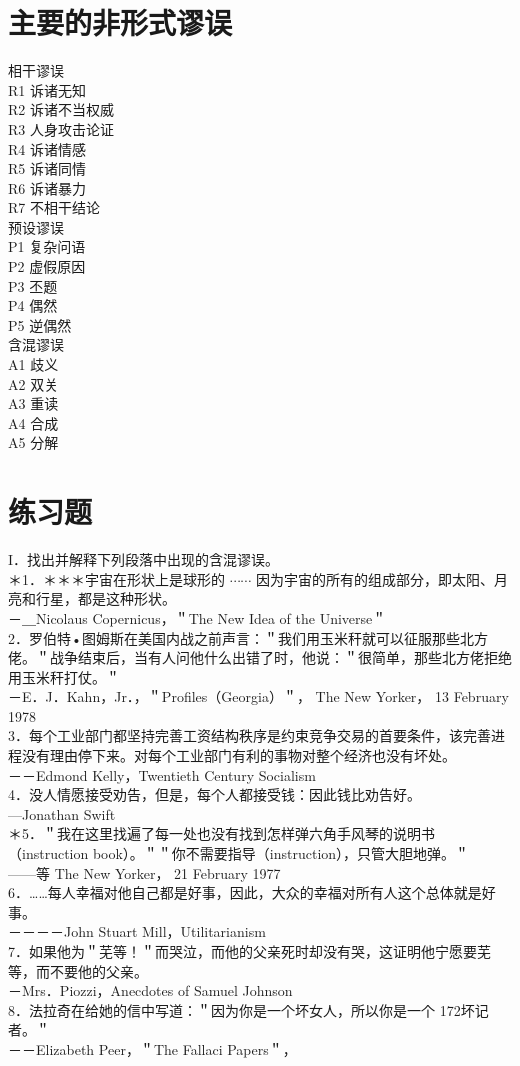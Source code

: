 \section*{主要的非形式谬误}
相干谬误\\
R1 诉诸无知\\
R2 诉诸不当权威\\
R3 人身攻击论证\\
R4 诉诸情感\\
R5 诉诸同情\\
R6 诉诸暴力\\
R7 不相干结论\\
预设谬误\\
P1 复杂问语\\
P2 虚假原因\\
P3 丕题\\
P4 偶然\\
P5 逆偶然\\
含混谬误\\
A1 歧义\\
A2 双关\\
A3 重读\\
A4 合成\\
A5 分解

\section*{练习题}
I．找出并解释下列段落中出现的含混谬误。\\
＊1．＊＊＊宇宙在形状上是球形的 $\cdots \cdots$ 因为宇宙的所有的组成部分，即太阳、月亮和行星，都是这种形状。\\
－＿Nicolaus Copernicus，＂The New Idea of the Universe＂\\
2．罗伯特•图姆斯在美国内战之前声言：＂我们用玉米秆就可以征服那些北方佬。＂战争结束后，当有人问他什么出错了时，他说：＂很简单，那些北方佬拒绝用玉米秆打仗。＂\\
－E．J．Kahn，Jr．，＂Profiles（Georgia）＂， The New Yorker， 13 February 1978\\
3．每个工业部门都坚持完善工资结构秩序是约束竞争交易的首要条件，该完善进程没有理由停下来。对每个工业部门有利的事物对整个经济也没有坏处。\\
－－Edmond Kelly，Twentieth Century Socialism\\
4．没人情愿接受劝告，但是，每个人都接受钱：因此钱比劝告好。\\
—Jonathan Swift\\
＊5．＂我在这里找遍了每一处也没有找到怎样弹六角手风琴的说明书 （instruction book）。＂＂你不需要指导（instruction），只管大胆地弹。＂\\
——等 The New Yorker， 21 February 1977\\
6．……每人幸福对他自己都是好事，因此，大众的幸福对所有人这个总体就是好事。\\
－－－－John Stuart Mill，Utilitarianism\\
7．如果他为＂芜等！＂而哭泣，而他的父亲死时却没有哭，这证明他宁愿要芜等，而不要他的父亲。\\
－Mrs．Piozzi，Anecdotes of Samuel Johnson\\
8．法拉奇在给她的信中写道：＂因为你是一个坏女人，所以你是一个 172坏记者。＂\\
－－Elizabeth Peer，＂The Fallaci Papers＂，


